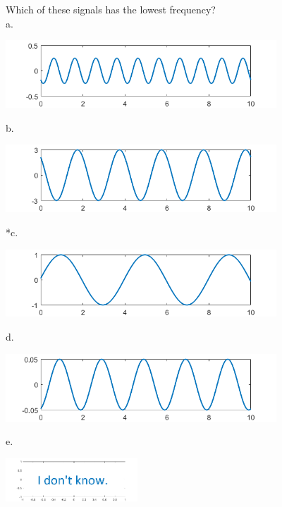 
Which of these signals has the lowest frequency?\\

a. 

\includegraphics[width=4in,height=1in]{../../Images/FrequencyDomainQ1a.png}

b. 

\includegraphics[width=4in,height=1in]{../../Images/FrequencyDomainQ1b.png}

*c. 

\includegraphics[width=4in,height=1in]{../../Images/FrequencyDomainQ1c.png}

d. 

\includegraphics[width=4in,height=1in]{../../Images/FrequencyDomainQ1d.png}

e.

\includegraphics[width=1.94778in,height=0.63207in]{../../Images/AnswerEGraph.png}\\
